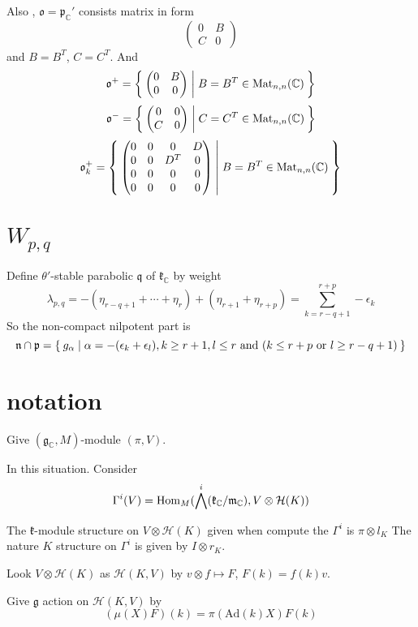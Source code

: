 \documentclass[12pt]{amsart}
\def\Hom{{\rm Hom}}
\def\Mat{{\rm Mat}}
\def\bC{{\mathbb{C}}}
\def\Ad{{\rm Ad}}
\def\Ad{\mathrm{Ad}}
\def\fnn{\mathfrak{n}}
\def\foo{\mathfrak{o}}
\def\fpp{\mathfrak{p}}
\def\fqq{\mathfrak{q}}
\def\fgg{\mathfrak{g}}
\def\fkk{\mathfrak{k}}
\def\chh{\mathcal{H}}
\def\fmm{\mathfrak{m}}
\def\Mat{\mathrm{Mat}}
\begin{document}
Also , $\foo = \fpp_\bC'$ consists matrix in form 
\[
\begin{pmatrix}
0 &  B \\
C & 0 
\end{pmatrix}
\]
and $B= B^T$, $C= C^T$.
And 
\[
\foo^+ = \Set{\begin{pmatrix}
0 &  B \\
0 & 0 
\end{pmatrix}
| B = B^T \in \Mat_{n,n}(\bC)
}
\]
\[
\foo^- = \Set{\begin{pmatrix}
0 &  0 \\
C & 0 
\end{pmatrix}
| C = C^T \in \Mat_{n,n}(\bC)
}
\]
\[
\foo_k^+ =  \Set{\begin{pmatrix}
0 &  0 &  0 &D \\
0 & 0  & D^T & 0 \\
0 & 0 & 0 & 0 \\
0 & 0 & 0 & 0 
\end{pmatrix}
| B = B^T \in \Mat_{n,n}(\bC)}
\]




\section{$W_{p,q}$}
Define $\theta'$-stable parabolic $\fqq$ of $\fkk_\bC$ by weight
\[
\lambda_{p,q} = -(\eta_{r-q+1} +  \cdots + \eta_r)+(\eta_{r+1} + \eta_{r+p})
 = \sum_{k=r-q+1}^{r+p} - \epsilon_{k}
\]
So the non-compact nilpotent part is 
\[
\fnn\cap \fpp = \Set{g_{\alpha}|\alpha = -(\epsilon_k+\epsilon_l), 
  k\geq r+1, l \leq r
  \text{ and } (
  k \leq r+p \text{ or } l \geq r-q+1)
}
\]

\section{notation}



Give $(\fgg_\bC, M)$-module $(\pi, V)$.

In this situation. 
Consider 
\[
\Gamma^i (V) = \Hom_{M}(\bigwedge^i(\fkk_\bC/\fmm_\bC), V\otimes \chh(K))
\]


The $\fkk$-module structure on $V\otimes \chh(K)$ given when compute the
$\Gamma^i$ is $\pi\otimes l_K$
The nature $K$ structure on $\Gamma^i$ is given by $I\otimes r_K$.

Look $V\otimes \chh(K)$ as $\chh(K, V)$ by $v\otimes f \mapsto F$, 
$F(k) = f(k)v$. 
 
Give $\fgg$ action on $\chh(K,V)$ by 
\[
(\mu(X)F)(k) = \pi(\Ad(k) X) F(k)
\]
\end{document}
